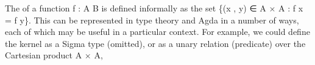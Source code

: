 \documentclass[a4paper,UKenglish,cleveref,autoref,thm-restate,11pt]{lipics-v2021}
\begin{document}
The  of a function \ab f \as : \ab A  \ab B is defined informally as the set \{(\ab x , \ab y) ∈ \ab A × \ab A : \ab f \ab x = \ab f \ab y\}. This can be represented in type theory and Agda in a number of ways, each of which may be useful in a particular context. For example, we could define the kernel as a Sigma type (omitted),
or as a unary relation (predicate) over the Cartesian product \ab A × \ab A,
\ccpad
\begin{code}%
\>[1]\AgdaSpace{}%
\AgdaSymbol{:}\AgdaSpace{}%
\AgdaSymbol{\{}\AgdaSpace{}%
\AgdaSymbol{:}\AgdaSpace{}%
%
\AgdaSymbol{\}\{}\AgdaSpace{}%
\AgdaSymbol{:}\AgdaSpace{}%
%
\AgdaSymbol{\}}\AgdaSpace{}%
\AgdaSpace{}%
\AgdaSymbol{(}\AgdaSpace{}%
\AgdaSpace{}%
\AgdaSymbol{)}\AgdaSpace{}%
\AgdaSpace{}%
\AgdaSpace{}%
\AgdaSymbol{(}\AgdaSpace{}%
\AgdaSpace{}%
\AgdaSymbol{)}\AgdaSpace{}%
\<%
\\
%
\>[1]\AgdaSpace{}%
\AgdaSpace{}%
\AgdaSymbol{(}\AgdaSpace{}%
\AgdaOperator{\AgdaInductiveConstructor{,}}\AgdaSpace{}%
\AgdaSymbol{)}\AgdaSpace{}%
\AgdaSymbol{=}\AgdaSpace{}%
\AgdaSpace{}%
\AgdaSpace{}%
\AgdaSpace{}%
\AgdaSpace{}%
\<%
\end{code}
\end{document}

